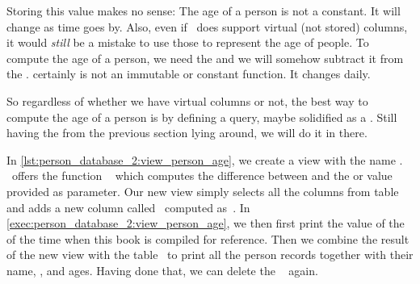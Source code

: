 Storing this value makes no sense:
The age of a person is not a constant.
It will change as time goes by.
Also, even if \postgresql\ does support virtual (not stored)  columns, it would \emph{still} be a mistake to use those to represent the age of people.%
%
%
%
To compute the age of a person, we need the  and we will somehow subtract it from the .
 certainly is not an immutable or constant function.
It changes daily.
%
%
%
%

So regardless of whether we have virtual  columns or not, the best way to compute the age of a person is by defining a query, maybe solidified as a .
Still having the  from the previous section lying around, we will do it in there.

In \cref{lst:person_database_2:view_person_age}, we create a view with the name .
\postgresql\ offers the function ~\cite{PGDG:PD:DTFAO} which computes the difference between  and the  or  value provided as parameter.
Our new view simply selects all the columns from table~ and adds a new column called~ computed as~.
In \cref{exec:person_database_2:view_person_age}, we then first print the value of the  of the time when this book is compiled for reference.
Then we combine the result of the new view  with the table~ to print all the person records together with their name, , and ages.
Having done that, we can delete the \db\  again.%
%
\endhsection%
%

